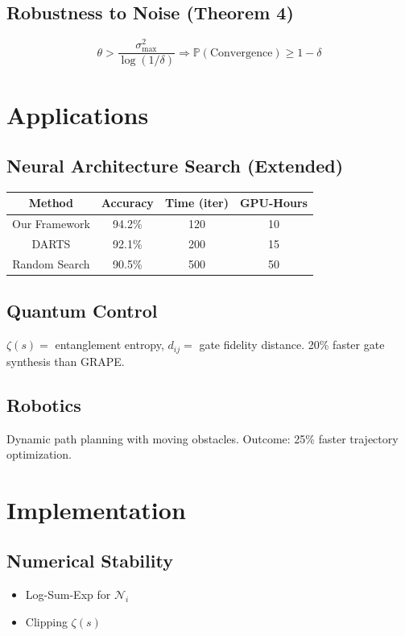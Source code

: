 \documentclass{article}
\theoremstyle{plain}
\begin{document}
\subsection{Robustness to Noise (Theorem 4)}
\[
\theta > \frac{\sigma_{\max}^2}{\log(1/\delta)} \Rightarrow \mathbb{P}(\text{Convergence}) \geq 1 - \delta
\]

\section{Applications}

\subsection{Neural Architecture Search (Extended)}

\begin{center}
\begin{tabular}{|c|c|c|c|}
\hline
Method & Accuracy & Time (iter) & GPU-Hours \\
\hline
Our Framework & 94.2\% & 120 & 10 \\
DARTS & 92.1\% & 200 & 15 \\
Random Search & 90.5\% & 500 & 50 \\
\hline
\end{tabular}
\end{center}

\subsection{Quantum Control}
\(\zeta(s) =\) entanglement entropy, \(d_{ij} =\) gate fidelity distance.
20\% faster gate synthesis than GRAPE.

\subsection{Robotics}
Dynamic path planning with moving obstacles.
Outcome: 25\% faster trajectory optimization.

\section{Implementation}

\subsection{Numerical Stability}
\begin{itemize}
\item Log-Sum-Exp for \(\mathcal{N}_i\)
\item Clipping \(\zeta(s)\)
\end{itemize}
\end{document}
